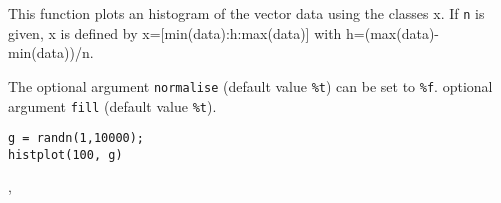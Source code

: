 \begin{mandescription}
  This function plots an histogram of the vector data using the
  classes x. If \verb+n+ is given, x is defined by x=[min(data):h:max(data)] with
  h=(max(data)-min(data))/n.

  The optional argument \verb+normalise+ (default value \verb+%t+) can be set to
  \verb+%f+.
  optional argument \verb+fill+ (default value \verb+%t+).


  
\end{mandescription}

\begin{examples}
\begin{Verbatim}
g = randn(1,10000);
histplot(100, g)
\end{Verbatim}

\end{examples}

\begin{manseealso}
  , 
\end{manseealso}

